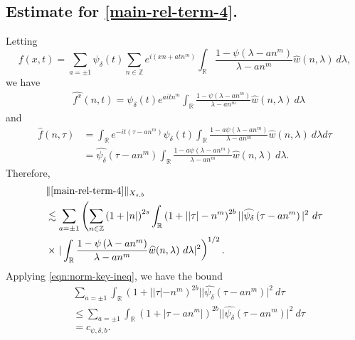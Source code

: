 \documentclass[12pt,reqno]{amsart}
\numberwithin{equation}{section}  %
\newcommand{\rr}{\mathbb{R}}
\newcommand{\zz}{\mathbb{Z}}
\newcommand{\wh}{\widehat}
\begin{document}
\subsection{Estimate for \eqref{main-rel-term-4}.}
Letting $$f(x,t) = \sum_{a = \pm 1} \psi_{\delta}(t) \sum_{n \in \zz} e^{i\left( xn +
atn^{m} \right)} 
\int_\rr \frac{1 - \psi\left( \lambda - an^{m} \right)}{\lambda - an^{m}} 
\wh{w} \left( n, \lambda \right) \ d \lambda,$$ we have
%
%
\begin{equation*}
	\begin{split}
		& \wh{f^x}(n, t) = \psi_{\delta}(t) e^{aitn^{m}} \int_\rr
		\frac{1 - \psi\left( \lambda - an^{m} \right)}{\lambda - an^{m}} 
		\wh{w}(n, \lambda) \ d \lambda
	\end{split}
\end{equation*}
and
\begin{equation*}
	\begin{split}
		 \wh{f}\left( n, \tau \right)
		 & = \int_\rr e^{-it\left( \tau - an^{m} 
		\right)} \psi_{\delta}(t) \int_\rr \frac{1 - a\psi\left( 
		\lambda - an^{m} 
		\right)}{\lambda - an^{m}} \wh{w}(n, \lambda) \ d \lambda d \tau
		\\
    & = \wh{\psi_{\delta}}\left( \tau - an^{m} \right) \int_\rr 
		\frac{1 - a\psi\left( 
		\lambda - an^{m} 
		\right)}{\lambda - an^{m}} \wh{w}(n, \lambda) \ d \lambda.
	\end{split}
\end{equation*}
Therefore,
%
%
\begin{equation}
  \label{iu}
	\begin{split}
		& \| \eqref{main-rel-term-4} \|_{X_{s,b}} 
		\\
    & \lesssim \sum_{a = \pm 1} \left( \sum_{n \in \zz} \left (1 + |n| \right)^{2s}
    \int_\rr \left( 1 + | |\tau| - n^{m } \right )^{2b} | | \wh{\psi_{\delta}}\left(
    \tau - an^{m } \right) |^2 \ d \tau \right.
		\\
		& \times \left . |
		\int_\rr \frac{1 - \psi\left( \lambda - an^{m } \right)}{\lambda -
		an^{m }} \wh{w}(n, \lambda) \ d \lambda |^2  \right)^{1/2}.
  \end{split}
\end{equation}
Applying \eqref{eqn:norm-key-ineq}, we have the bound
%
%
\begin{equation*}
\begin{split}
& \sum_{a = \pm 1} 
\int_\rr \left( 1 + | |\tau| - n^{m } \right )^{2b} | | \wh{\psi_{\delta}}\left(
    \tau - an^{m } \right) |^2 \ d \tau 
    \\
    & \le  \sum_{a = \pm 1} 
    \int_\rr \left( 1 + |\tau - an^{m } | \right )^{2b} | | \wh{\psi_{\delta}}\left(
    \tau - an^{m } \right) |^2 \ d \tau 
    \\
    & = c_{\psi, \delta, b}.
\end{split}
\end{equation*}
\end{document}
